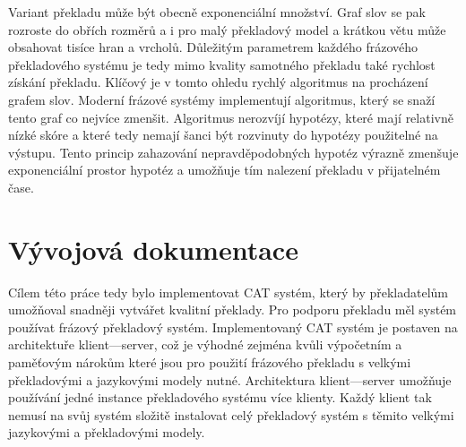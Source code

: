 \documentclass[12pt,a4paper]{report}
\begin{document}
Variant překladu může být obecně exponenciální množství. Graf slov se pak rozroste do obřích rozměrů a i pro malý překladový model a krátkou větu může obsahovat tisíce hran a vrcholů. Důležitým parametrem každého frázového překladového systému je tedy mimo kvality samotného překladu také rychlost získání překladu. Klíčový je v tomto ohledu rychlý algoritmus na procházení grafem slov. Moderní frázové systémy implementují algoritmus, který se snaží tento graf co nejvíce zmenšit. Algoritmus nerozvíjí hypotézy, které mají relativně nízké skóre a které tedy nemají šanci být rozvinuty do hypotézy použitelné na výstupu. Tento princip zahazování nepravděpodobných hypotéz výrazně zmenšuje exponenciální prostor hypotéz a umožňuje tím nalezení překladu v přijatelném čase.




\chapter{Vývojová dokumentace}
Cílem této práce tedy bylo implementovat CAT systém, který by překladatelům umožňoval snadněji vytvářet kvalitní překlady. Pro podporu překladu měl systém používat frázový překladový systém. Implementovaný CAT systém je postaven na architektuře klient---server, což je výhodné zejména kvůli výpočetním a paměťovým nárokům které jsou pro použití frázového překladu s velkými překladovými a jazykovými modely nutné. Architektura klient---server umožňuje používání jedné instance překladového systému více klienty. Každý klient tak nemusí na svůj systém složitě instalovat celý překladový systém s těmito velkými jazykovými a překladovými modely.
\end{document}
